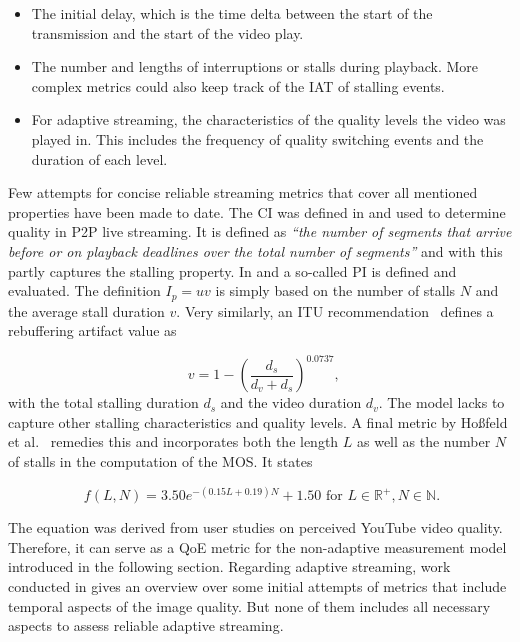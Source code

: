 \begin{itemize}
	\item The initial delay, which is the time delta between the start of the transmission and the start of the video play.

	\item The number and lengths of interruptions or stalls during playback. More complex metrics could also keep track of the \acrshort{IAT} of stalling events.

	\item For adaptive streaming, the characteristics of the quality levels the video was played in. This includes the frequency of quality switching events and the duration of each level.
\end{itemize}

Few attempts for concise reliable streaming metrics that cover all mentioned properties have been made to date. The \gls{CI} was defined in \cite{1498486} and used to determine quality in \gls{P2P} live streaming. It is defined as \textit{\enquote{the number of segments that arrive before or on playback deadlines over the total number of segments}} and with this partly captures the stalling property. In \cite{5634160} and \cite{DBLP:journals/corr/SeyedebrahimiBP13} a so-called \gls{PI} is defined and evaluated. The definition $I_p = uv$ is simply based on the number of stalls $N$ and the average stall duration $v$. Very similarly, an \gls{ITU} recommendation~\cite{ituP1202.1} defines a rebuffering artifact value as 

\begin{equation}
	\phantom{,}v = 1 - {\left(\frac{d_s}{d_v + d_s}\right)}^{0.0737}\text{,}
\end{equation}
%
 with the total stalling duration $d_s$ and the video duration $d_v$. The model lacks to capture other stalling characteristics and quality levels. A final metric by Hoßfeld 
et al.~\cite{hossfeld2013youtubeqoe} remedies this and incorporates both the length $L$ as well as the number $N$ of stalls in the computation of the \gls{MOS}. It states

\begin{equation}
	\phantom{.} f(L,N) = 3.50e^{-(0.15L +0.19)N} + 1.50 \text{ for } L \in \mathbb{R}^{+}, N \in \mathbb{N}.
\label{c3:eqn:hossfeld-stalling-model}
\end{equation}

The equation was derived from user studies on perceived YouTube video quality. Therefore, it can serve as a \gls{QoE} metric for the non-adaptive measurement model introduced in the following section. Regarding adaptive streaming, work conducted in \cite{6603210} gives an overview over some initial attempts of metrics that include temporal aspects of the image quality. But none of them includes all necessary aspects to assess reliable adaptive streaming.

